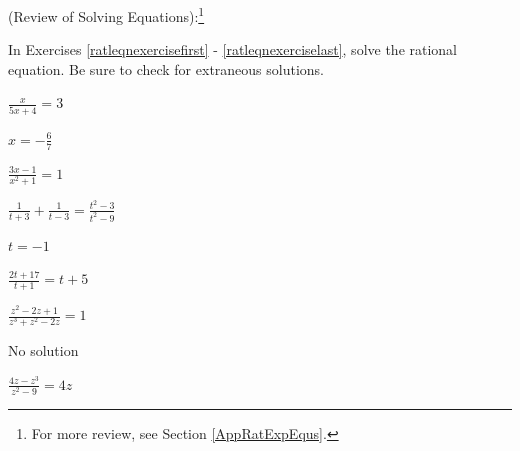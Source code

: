 \documentclass{ximera}
\begin{document}
	\author{Stitz-Zeager}


\begin{question}
(Review of Solving Equations):\footnote{For more review, see Section \ref{AppRatExpEqus}.} 

In Exercises \ref{ratleqnexercisefirst} - \ref{ratleqnexerciselast},  solve the rational equation.  Be sure to check for extraneous solutions.

\begin{problem}\label{ratleqnexercisefirst}
$\frac{x}{5x + 4} = 3$ 

\begin{solution}
$x = -\frac{6}{7}$
\end{solution}
\end{problem}

\begin{problem}
$\frac{3x - 1}{x^{2} + 1} = 1$ 

\begin{selectAll}
  \end{selectAll}
\end{problem} 

\begin{problem}
$\frac{1}{t + 3} + \frac{1}{t - 3} = \frac{t^{2} - 3}{t^{2} - 9}$ 

\begin{solution}
$t = -1$
\end{solution}
\end{problem} 

\begin{problem}
$\frac{2t + 17}{t + 1} = t + 5$

\begin{selectAll}
  \end{selectAll}
\end{problem}  

\begin{problem}
$\frac{z^{2} - 2z + 1}{z^{3} + z^{2} - 2z} = 1$ 

\begin{solution}
No solution
\end{solution}
\end{problem}   

\begin{problem}\label{ratleqnexerciselast}
$\frac{4z- z^3}{z^{2} - 9} = 4z$  

\begin{selectAll}
  \end{selectAll}
\end{problem}  

\end{question}
\end{document}
